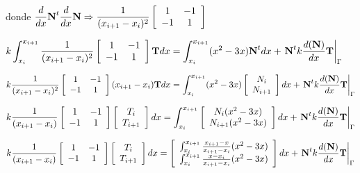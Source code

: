 \documentclass[12pt]{report}
\begin{document}
        donde $\displaystyle \frac{d}{dx}\textbf{N}^t \frac{d}{dx}\textbf{N} \Rightarrow \frac{1}{(x_{i+1}-x_i)^2} \left[ \begin{array}{c c} 1 & -1 \\ -1 & 1\end{array} \right]$
        
        \begin{center}
            $\displaystyle k \int_{x_i}^{x_{i+1}} \frac{1}{(x_{i+1}-x_i)^2} \left[ \begin{array}{c c} 1 & -1 \\ -1 & 1\end{array} \right] \textbf{T} dx = \int_{x_i}^{x_{i+1}} (x^2 -3x) \textbf{N}^t dx + \left. \textbf{N}^t  k \frac{d(\textbf{N})}{dx} \textbf{T} \right|_{\Gamma} $

            $\displaystyle k \frac{1}{(x_{i+1}-x_i)^2} \left[ \begin{array}{c c} 1 & -1 \\ -1 & 1\end{array} \right] (x_{i+1}-x_i) \textbf{T} dx =  \int_{x_i}^{x_{i+1}} (x^2 -3x) \left[ \begin{array}{c} N_i \\ N_{i+1} \end{array} \right] dx + \left. \textbf{N}^t  k \frac{d(\textbf{N})}{dx} \textbf{T} \right|_{\Gamma}$

            $\displaystyle k \frac{1}{(x_{i+1}-x_i)} \left[ \begin{array}{c c} 1 & -1 \\ -1 & 1\end{array} \right] \left[ \begin{array}{c} T_i \\ T_{i+1} \end{array} \right] dx =  \int_{x_i}^{x_{i+1}}  \left[ \begin{array}{c} N_i(x^2 -3x) \\ N_{i+1}(x^2 -3x) \end{array} \right] dx + \left. \textbf{N}^t  k \frac{d(\textbf{N})}{dx} \textbf{T} \right|_{\Gamma}$

            $\displaystyle k \frac{1}{(x_{i+1}-x_i)} \left[ \begin{array}{c c} 1 & -1 \\ -1 & 1\end{array} \right] \left[ \begin{array}{c} T_i \\ T_{i+1} \end{array} \right] dx =  \left[ \begin{array}{c} \int_{x_i}^{x_{i+1}} \frac{x_{i+1}-x}{x_{i+1}-x_i}(x^2 -3x) \\ \int_{x_i}^{x_{i+1}} \frac{x-x_i}{x_{i+1}-x_i}(x^2 -3x) \end{array} \right] dx +  \left. \textbf{N}^t  k \frac{d(\textbf{N})}{dx} \textbf{T} \right|_{\Gamma}$


\end{center}
\end{document}
